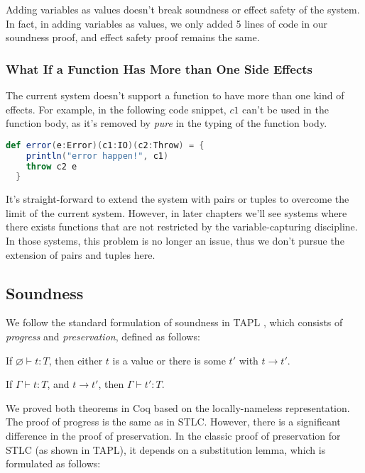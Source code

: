 Adding variables as values doesn't break soundness or effect safety of
the system. In fact, in adding variables as values, we only added 5
lines of code in our soundness proof, and effect safety proof remains
the same.

\subsubsection{What If a Function Has More than One Side Effects}

The current system doesn't support a function to have more than one
kind of effects. For example, in the following code snippet, $c1$
can't be used in the function body, as it's removed by \emph{pure} in
the typing of the function body.

\begin{lstlisting}[language=Scala]
  def error(e:Error)(c1:IO)(c2:Throw) = {
    println("error happen!", c1)
    throw c2 e
  }
\end{lstlisting}

It's straight-forward to extend the system with pairs or tuples to
overcome the limit of the current system. However, in later chapters
we'll see systems where there exists functions that are not restricted
by the variable-capturing discipline.  In those systems, this problem
is no longer an issue, thus we don't pursue the extension of pairs and
tuples here.

\subsection{Soundness}

We follow the standard formulation of soundness in TAPL
\cite{bpierce2002types}, which consists of \emph{progress} and
\emph{preservation}, defined as follows:

\begin{theorem}[Progress]
If $\varnothing \vdash t : T$, then either $t$ is a value or there is some
$t'$ with $t \longrightarrow t'$.
\end{theorem}

\begin{theorem}[Preservation]
If $\Gamma \vdash t : T$, and $t \longrightarrow t'$, then $\Gamma
\vdash t' : T$.
\end{theorem}

We proved both theorems in Coq based on the locally-nameless
representation. The proof of progress is the same as in STLC. However,
there is a significant difference in the proof of preservation. In the
classic proof of preservation for STLC (as shown in TAPL), it depends
on a substitution lemma, which is formulated as follows:

